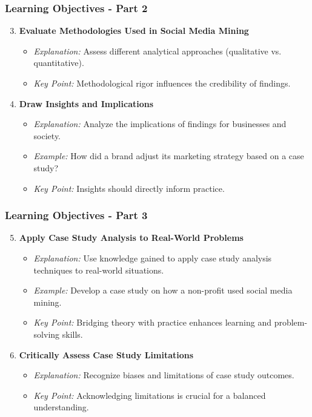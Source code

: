 \documentclass{beamer}
\begin{document}
\begin{frame}[fragile]
    \frametitle{Learning Objectives - Part 2}
    \begin{enumerate}
        \setcounter{enumi}{2}  %
        \item \textbf{Evaluate Methodologies Used in Social Media Mining}
        \begin{itemize}
            \item \textit{Explanation:} Assess different analytical approaches (qualitative vs. quantitative).
            \item \textit{Key Point:} Methodological rigor influences the credibility of findings.
        \end{itemize}

        \item \textbf{Draw Insights and Implications}
        \begin{itemize}
            \item \textit{Explanation:} Analyze the implications of findings for businesses and society.
            \item \textit{Example:} How did a brand adjust its marketing strategy based on a case study?
            \item \textit{Key Point:} Insights should directly inform practice.
        \end{itemize}
    \end{enumerate}
\end{frame}

\begin{frame}[fragile]
    \frametitle{Learning Objectives - Part 3}
    \begin{enumerate}
        \setcounter{enumi}{4}  %
        \item \textbf{Apply Case Study Analysis to Real-World Problems}
        \begin{itemize}
            \item \textit{Explanation:} Use knowledge gained to apply case study analysis techniques to real-world situations.
            \item \textit{Example:} Develop a case study on how a non-profit used social media mining.
            \item \textit{Key Point:} Bridging theory with practice enhances learning and problem-solving skills.
        \end{itemize}

        \item \textbf{Critically Assess Case Study Limitations}
        \begin{itemize}
            \item \textit{Explanation:} Recognize biases and limitations of case study outcomes.
            \item \textit{Key Point:} Acknowledging limitations is crucial for a balanced understanding.
        \end{itemize}
    \end{enumerate}
\end{frame}
\end{document}
